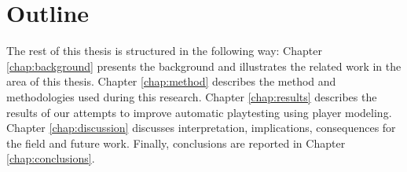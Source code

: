 \section{Outline}
The rest of this thesis is structured in the following way:
Chapter \ref{chap:background} presents the background and illustrates the related work in the area of this thesis. Chapter \ref{chap:method} describes the method and methodologies used during this research. Chapter \ref{chap:results} describes the results of our attempts to improve automatic playtesting using player modeling. Chapter \ref{chap:discussion} discusses interpretation, implications, consequences for the field and future work. Finally, conclusions are reported in Chapter \ref{chap:conclusions}.
